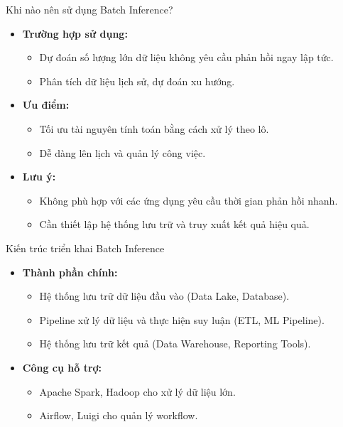 \documentclass{beamer}
\begin{document}
\begin{frame}{Khi nào nên sử dụng Batch Inference?}
    \begin{itemize}
        \item \textbf{Trường hợp sử dụng:}
        \begin{itemize}
            \item Dự đoán số lượng lớn dữ liệu không yêu cầu phản hồi ngay lập tức.
            \item Phân tích dữ liệu lịch sử, dự đoán xu hướng.
        \end{itemize}
        \item \textbf{Ưu điểm:}
        \begin{itemize}
            \item Tối ưu tài nguyên tính toán bằng cách xử lý theo lô.
            \item Dễ dàng lên lịch và quản lý công việc.
        \end{itemize}
        \item \textbf{Lưu ý:}
        \begin{itemize}
            \item Không phù hợp với các ứng dụng yêu cầu thời gian phản hồi nhanh.
            \item Cần thiết lập hệ thống lưu trữ và truy xuất kết quả hiệu quả.
        \end{itemize}
    \end{itemize}
\end{frame}

\begin{frame}{Kiến trúc triển khai Batch Inference}
    \begin{itemize}
        \item \textbf{Thành phần chính:}
        \begin{itemize}
            \item Hệ thống lưu trữ dữ liệu đầu vào (Data Lake, Database).
            \item Pipeline xử lý dữ liệu và thực hiện suy luận (ETL, ML Pipeline).
            \item Hệ thống lưu trữ kết quả (Data Warehouse, Reporting Tools).
        \end{itemize}
        \item \textbf{Công cụ hỗ trợ:}
        \begin{itemize}
            \item Apache Spark, Hadoop cho xử lý dữ liệu lớn.
            \item Airflow, Luigi cho quản lý workflow.
        \end{itemize}
    \end{itemize}
\end{frame}
\end{document}
